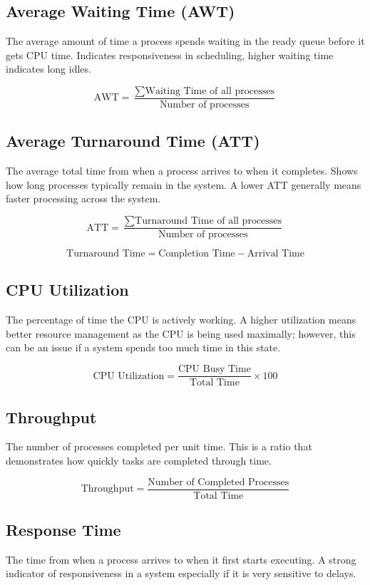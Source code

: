 \documentclass[conference]{report}
\begin{document}
\subsection*{Average Waiting Time (AWT)}
The average amount of time a process spends waiting in the ready queue before it gets CPU time. Indicates responsiveness in scheduling, higher waiting time indicates long idles.

\[
\text{AWT} = \frac{\sum \text{Waiting Time of all processes}}{\text{Number of processes}}
\]

\subsection*{Average Turnaround Time (ATT)}
The average total time from when a process arrives to when it completes. Shows how long processes typically remain in the system. A lower ATT generally means faster processing across the system.

\[
\text{ATT} = \frac{\sum \text{Turnaround Time of all processes}}{\text{Number of processes}}
\]

\[
\text{Turnaround Time} = \text{Completion Time} - \text{Arrival Time}
\]

\subsection*{CPU Utilization}
The percentage of time the CPU is actively working. A higher utilization means better resource management as the CPU is being used maximally; however, this can be an issue if a system spends too much time in this state.

\[
\text{CPU Utilization} = \frac{\text{CPU Busy Time}}{\text{Total Time}} \times 100
\]

\subsection*{Throughput}
The number of processes completed per unit time. This is a ratio that demonstrates how quickly tasks are completed through time.

\[
\text{Throughput} = \frac{\text{Number of Completed Processes}}{\text{Total Time}}
\]

\subsection*{Response Time}
The time from when a process arrives to when it first starts executing. A strong indicator of responsiveness in a system especially if it is very sensitive to delays.
\end{document}
